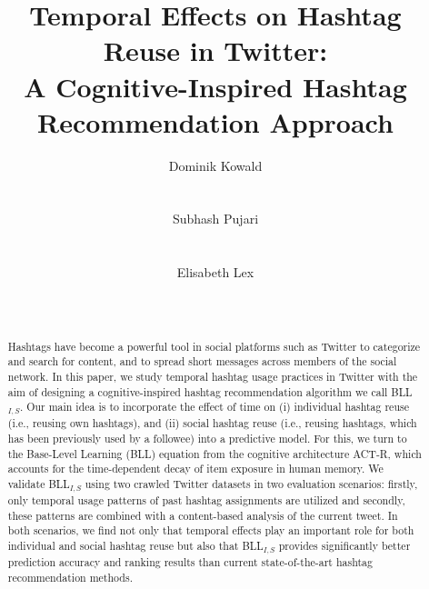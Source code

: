 \documentclass{sig-alternate-05-2015}
\begin{document}
\title{Temporal Effects on Hashtag Reuse in Twitter:\\A Cognitive-Inspired Hashtag Recommendation Approach}

\author{
\alignauthor
Dominik Kowald\\
			 \\
       \\
\alignauthor
Subhash Pujari\\
			 \\
       \\
\alignauthor
Elisabeth Lex\\
			 \\
       \\
}



\maketitle


\begin{abstract}
Hashtags have become a powerful tool in social platforms such as Twitter to categorize and search for content, and to spread short messages across members of the social network. In this paper, we study temporal hashtag usage practices in Twitter with the aim of designing a cognitive-inspired hashtag recommendation algorithm we call BLL$_{I,S}${}. Our main idea is to incorporate the effect of time on (i) individual hashtag reuse (i.e., reusing own hashtags), and (ii) social hashtag reuse (i.e., reusing hashtags, which has been previously used by a followee) into a predictive model. For this, we turn to the Base-Level Learning (BLL) equation from the cognitive architecture ACT-R, which accounts for the time-dependent decay of item exposure in human memory. We validate BLL$_{I,S}${} using two crawled Twitter datasets in two evaluation scenarios: firstly, only temporal usage patterns of past hashtag assignments are utilized and secondly, these patterns are combined with a content-based analysis of the current tweet. In both scenarios, we find not only that temporal effects play an important role for both individual and social hashtag reuse but also that BLL$_{I,S}${} provides significantly better prediction accuracy and ranking results than current state-of-the-art hashtag recommendation methods.
\end{abstract}
\end{document}
